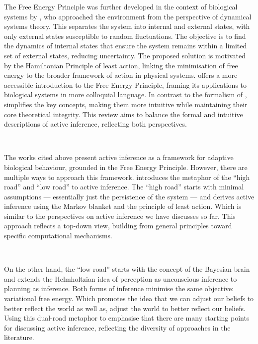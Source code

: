 \documentclass{article}
\begin{document}
The Free Energy Principle was further developed in the context of biological systems by \citet{friston2012free}, who approached the environment from the perspective of dynamical systems theory. This separates the system into internal and external states, with only external states susceptible to random fluctuations. The objective is to find the dynamics of internal states that ensure the system remains within a limited set of external states, reducing uncertainty. The proposed solution is motivated by the Hamiltonian Principle of least action, linking the minimisation of free energy to the broader framework of action in physical systems. \citet{millidge2019combining} offers a more accessible introduction to the Free Energy Principle, framing its applications to biological systems in more colloquial language. In contrast to the formalism of \citet{friston2012active}, \citet{millidge2019combining} simplifies the key concepts, making them more intuitive while maintaining their core theoretical integrity. This review aims to balance the formal and intuitive descriptions of active inference, reflecting both perspectives.

\

The works cited above present active inference as a framework for adaptive biological behaviour, grounded in the Free Energy Principle. However, there are multiple ways to approach this framework. \citet{parr2022ActiveInference} introduces the metaphor of the ``high road'' and ``low road'' to active inference. The ``high road'' starts with minimal assumptions — essentially just the persistence of the system — and derives active inference using the Markov blanket and the principle of least action. Which is similar to the perspectives on active inference we have discusses so far. This approach reflects a top-down view, building from general principles toward specific computational mechanisms.

\

On the other hand, the ``low road'' starts with the concept of the Bayesian brain and extends the Helmholtzian idea of perception as unconscious inference to planning as inference. Both forms of inference minimise the same objective: variational free energy. \citet{parr2022ActiveInference} Which promotes the idea that we can adjust our beliefs to better reflect the world as well as, adjust the world to better reflect our beliefs. Using this dual-road metaphor to emphasise that there are many starting points for discussing active inference, reflecting the diversity of approaches in the literature.
\end{document}
